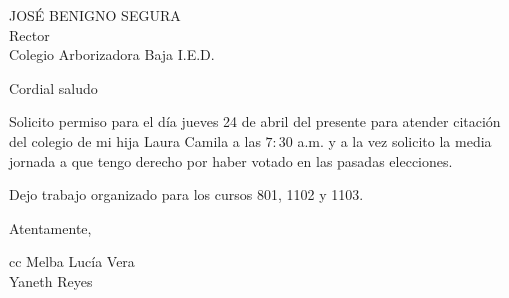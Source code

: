 \documentclass[letterpaper,spanish,11pt]{letter}
\begin{document}
\begin{letter}{JOSÉ BENIGNO SEGURA\\Rector\\Colegio Arborizadora Baja I.E.D.}
	
\opening{Cordial saludo}
Solicito permiso para el día jueves 24 de abril del presente para atender citación del colegio de mi hija Laura Camila a las $7:30$ a.m. y a la vez solicito la media jornada a que tengo derecho por haber votado en las pasadas elecciones.

Dejo trabajo organizado para los cursos 801, 1102 y 1103.
\closing{Atentamente,}

cc{ Melba Lucía Vera\\Yaneth Reyes}

\end{letter}
\end{document}
